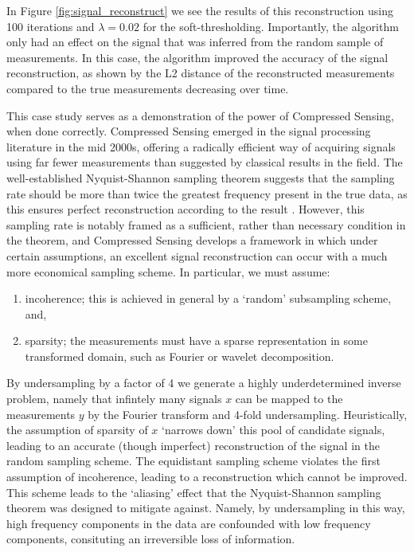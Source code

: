 \documentclass[12pt]{article}
\begin{document}
In Figure \ref{fig:signal_reconstruct} we see the results of this reconstruction using 100 iterations and $\lambda=0.02$ for the soft-thresholding.
Importantly, the algorithm only had an effect on the signal that was inferred from the random sample of measurements.
In this case, the algorithm improved the accuracy of the signal reconstruction,
as shown by the L2 distance of the reconstructed measurements compared to the true measurements decreasing over time.

This case study serves as a demonstration of the power of Compressed Sensing,
when done correctly.
Compressed Sensing emerged in the signal processing literature in the mid 2000s,
offering a radically efficient way of acquiring signals using far fewer measurements than suggested by classical results in the field.
The well-established Nyquist-Shannon sampling theorem suggests that the sampling rate should be more than twice the greatest frequency present in the true data,
as this ensures perfect reconstruction according to the result \cite{shannon}.
However, this sampling rate is notably framed as a sufficient, rather than necessary condition in the theorem,
and Compressed Sensing develops a framework in which under certain assumptions,
an excellent signal reconstruction can occur with a much more economical sampling scheme.
In particular, we must assume:
\begin{enumerate}
    \item incoherence; this is achieved in general by a `random' subsampling scheme, and,
    \item sparsity; the measurements must have a sparse representation in some transformed domain, such as Fourier or wavelet decomposition.
\end{enumerate}

By undersampling by a factor of 4 we generate a highly underdetermined inverse problem,
namely that infintely many signals $x$ can be mapped to the measurements $y$ by the Fourier transform and 4-fold undersampling.
Heuristically, the assumption of sparsity of $x$ `narrows down' this pool of candidate signals,
leading to an accurate (though imperfect) reconstruction of the signal in the random sampling scheme.
The equidistant sampling scheme violates the first assumption of incoherence,
leading to a reconstruction which cannot be improved.
This scheme leads to the `aliasing' effect that the Nyquist-Shannon sampling theorem was designed to mitigate against.
Namely, by undersampling in this way, high frequency components in the data are confounded with low frequency components,
consituting an irreversible loss of information.
\end{document}
